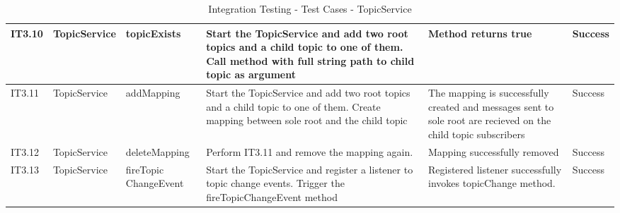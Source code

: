 \begin{table}[ht!]
\begin{tabular}{|m{0.5cm}|m{1.5cm}|m{1.5cm}|m{3cm}|m{3cm}|m{1.5cm}|}
IT3.10 & TopicService & topicExists & Start the TopicService and add two root topics and a child topic to one of them. Call method with full string path to child topic as argument & Method returns true & Success \\ \hline
IT3.11 & TopicService & addMapping & Start the TopicService and add two root topics and a child topic to one of them. Create mapping between sole root and the child topic & The mapping is successfully created and messages sent to sole root are recieved on the child topic subscribers & Success \\ \hline
IT3.12 & TopicService & deleteMapping & Perform IT3.11 and remove the mapping again. & Mapping successfully removed & Success \\ \hline
IT3.13 & TopicService & fireTopic ChangeEvent & Start the TopicService and register a listener to topic change events. Trigger the fireTopicChangeEvent method & Registered listener successfully invokes topicChange method. & Success \\ \hline
\end{tabular}
\caption{Integration Testing - Test Cases - TopicService}
\label{table:integration-testing-cases-topicservice}
\end{table}

